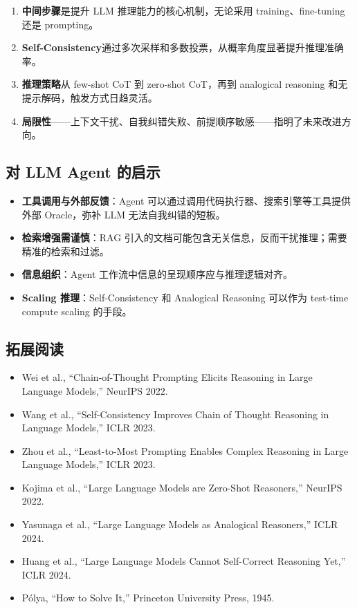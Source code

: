 \documentclass[a4paper]{article}
\begin{document}
\begin{enumerate}
    \item \textbf{中间步骤}是提升 LLM 推理能力的核心机制，无论采用 training、fine-tuning 还是 prompting。
    \item \textbf{Self-Consistency}通过多次采样和多数投票，从概率角度显著提升推理准确率。
    \item \textbf{推理策略}从 few-shot CoT 到 zero-shot CoT，再到 analogical reasoning 和无提示解码，触发方式日趋灵活。
    \item \textbf{局限性}——上下文干扰、自我纠错失败、前提顺序敏感——指明了未来改进方向。
\end{enumerate}

\subsection{对 LLM Agent 的启示}

\begin{itemize}
    \item \textbf{工具调用与外部反馈}：Agent 可以通过调用代码执行器、搜索引擎等工具提供外部 Oracle，弥补 LLM 无法自我纠错的短板。
    \item \textbf{检索增强需谨慎}：RAG 引入的文档可能包含无关信息，反而干扰推理；需要精准的检索和过滤。
    \item \textbf{信息组织}：Agent 工作流中信息的呈现顺序应与推理逻辑对齐。
    \item \textbf{Scaling 推理}：Self-Consistency 和 Analogical Reasoning 可以作为 test-time compute scaling 的手段。
\end{itemize}

\subsection{拓展阅读}

\begin{itemize}
    \item Wei et al., ``Chain-of-Thought Prompting Elicits Reasoning in Large Language Models,'' NeurIPS 2022.
    \item Wang et al., ``Self-Consistency Improves Chain of Thought Reasoning in Language Models,'' ICLR 2023.
    \item Zhou et al., ``Least-to-Most Prompting Enables Complex Reasoning in Large Language Models,'' ICLR 2023.
    \item Kojima et al., ``Large Language Models are Zero-Shot Reasoners,'' NeurIPS 2022.
    \item Yasunaga et al., ``Large Language Models as Analogical Reasoners,'' ICLR 2024.
    \item Huang et al., ``Large Language Models Cannot Self-Correct Reasoning Yet,'' ICLR 2024.
    \item P\'{o}lya, ``How to Solve It,'' Princeton University Press, 1945.
\end{itemize}

\end{document}
